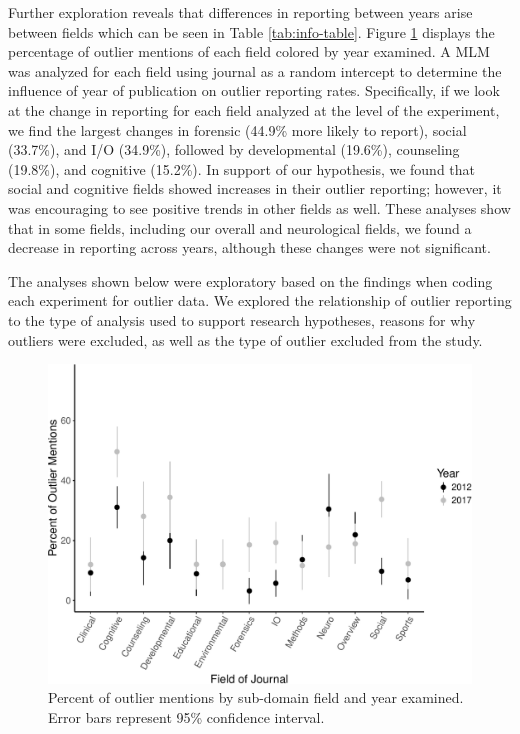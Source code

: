 \documentclass[english,man]{apa6}
\theoremstyle{definition}
\theoremstyle{definition}
\theoremstyle{definition}
\theoremstyle{remark}
\begin{document}
Further exploration reveals that differences in reporting between years
arise between fields which can be seen in Table \ref{tab:info-table}.
Figure \ref{fig:type-graph} displays the percentage of outlier mentions
of each field colored by year examined. A MLM was analyzed for each
field using journal as a random intercept to determine the influence of
year of publication on outlier reporting rates. Specifically, if we look
at the change in reporting for each field analyzed at the level of the
experiment, we find the largest changes in forensic (44.9\% more likely
to report), social (33.7\%), and I/O (34.9\%), followed by developmental
(19.6\%), counseling (19.8\%), and cognitive (15.2\%). In support of our
hypothesis, we found that social and cognitive fields showed increases
in their outlier reporting; however, it was encouraging to see positive
trends in other fields as well. These analyses show that in some fields,
including our overall and neurological fields, we found a decrease in
reporting across years, although these changes were not significant.

The analyses shown below were exploratory based on the findings when
coding each experiment for outlier data. We explored the relationship of
outlier reporting to the type of analysis used to support research
hypotheses, reasons for why outliers were excluded, as well as the type
of outlier excluded from the study.

\begin{figure}
\centering
\includegraphics{outliers_manuscript_files/figure-latex/type-graph-1.pdf}
\caption{\label{fig:type-graph}Percent of outlier mentions by sub-domain
field and year examined. Error bars represent 95\% confidence interval.}
\end{figure}
\end{document}
